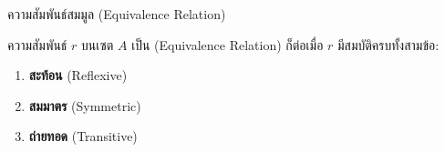 \documentclass[11pt, aspectratio=169]{beamer}
\begin{document}
\begin{frame}{ความสัมพันธ์สมมูล (Equivalence Relation)}
  \begin{explanation}[นิยาม]
    ความสัมพันธ์ $r$ บนเซต $A$ เป็น  (Equivalence Relation)
    ก็ต่อเมื่อ $r$ มีสมบัติครบทั้งสามข้อ:

    \medskip
    \begin{enumerate}
      \item \textbf{สะท้อน} (Reflexive)
      \item \textbf{สมมาตร} (Symmetric)
      \item \textbf{ถ่ายทอด} (Transitive)
    \end{enumerate}
  \end{explanation}
\end{frame}
\end{document}

